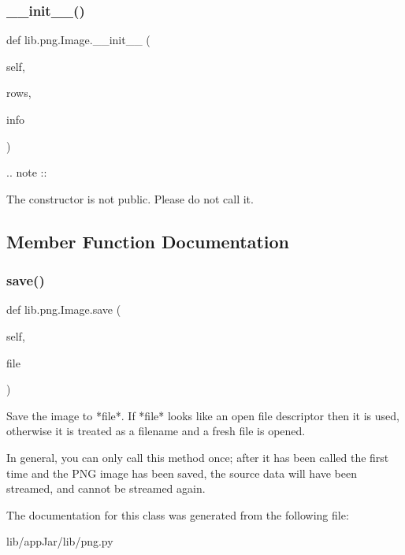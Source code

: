 \subsubsection{\texorpdfstring{\+\_\+\+\_\+init\+\_\+\+\_\+()}{\_\_init\_\_()}}
{\footnotesize\ttfamily def lib.\+png.\+Image.\+\_\+\+\_\+init\+\_\+\+\_\+ (\begin{DoxyParamCaption}\item[{}]{self,  }\item[{}]{rows,  }\item[{}]{info }\end{DoxyParamCaption})}

\begin{DoxyVerb}.. note ::

  The constructor is not public.  Please do not call it.
\end{DoxyVerb}
 

\subsection{Member Function Documentation}
\mbox{\label{classlib_1_1png_1_1_image_a5bee5a78ede9adcf53821412cf15340b}} 
\subsubsection{\texorpdfstring{save()}{save()}}
{\footnotesize\ttfamily def lib.\+png.\+Image.\+save (\begin{DoxyParamCaption}\item[{}]{self,  }\item[{}]{file }\end{DoxyParamCaption})}

\begin{DoxyVerb}Save the image to *file*.  If *file* looks like an open file
descriptor then it is used, otherwise it is treated as a
filename and a fresh file is opened.

In general, you can only call this method once; after it has
been called the first time and the PNG image has been saved, the
source data will have been streamed, and cannot be streamed
again.
\end{DoxyVerb}
 

The documentation for this class was generated from the following file\+:\begin{DoxyCompactItemize}
\item 
lib/app\+Jar/lib/png.\+py\end{DoxyCompactItemize}
